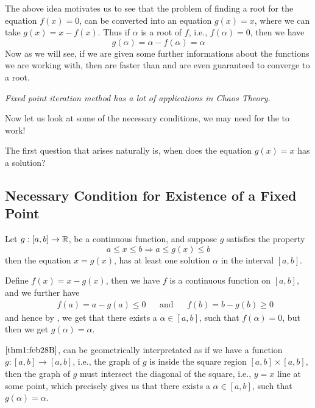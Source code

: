 The above idea motivates us to see that the problem of finding a root for the equation $f(x) = 0$, can be converted into an equation $g(x) = x$, where we can take $g(x) = x - f(x)$. Thus if $\alpha$ is a root of $f$, i.e., $f(\alpha) = 0$, then we have 
\[g(\alpha) = \alpha - f(\alpha) = \alpha\]
Now as we will see, if we are given some further informations about the functions we are working with, then  are faster than  and are even guaranteed to converge to a root.

\begin{tcolorbox}[
    colback = cyan!5,
    colframe = cyan!75
]
     \textit{Fixed point iteration method has a lot of applications in Chaos Theory.} 
\end{tcolorbox}

Now let us look at some of the necessary conditions, we may need for the  to work! 

The first question that arises naturally is, when does the equation $g(x) = x$ has a solution?

\subsection{Necessary Condition for Existence of a Fixed Point}

\begin{thm}\label{thm1:feb28B}
    Let $g :[a,b] \to \mathbb{R}$, be a continuous function, and suppose $g$ satisfies the property 
    \[
        a \leq x \leq b \Rightarrow a \leq g(x) \leq b
    \]
    then the equation $x = g(x)$, has at least one solution $ \alpha $ in the interval $[a,b]$.
\end{thm}

\begin{prf}
    Define $f(x) = x - g(x)$, then we have $f$ is a continuous function on $[a,b]$, and we further have 
    \begin{align*}
        &&f(a) = a-g(a) \leq 0 &&\mbox{and} &&f(b) = b - g(b) \geq 0
    \end{align*}
    and hence by , we get that there exists a $\alpha \in [a,b]$, such that $f(\alpha) = 0$, but then we get $g(\alpha) = \alpha$.
\end{prf}

 $\ref{thm1:feb28B}$, can be geometrically interpretated as if we have a function $g :[a,b] \to [a,b]$, i.e., the graph of $g$ is inside the square region $[a,b] \times [a,b]$, then the graph of $g$ must intersect the diagonal of the square, i.e., $y = x$ line at some point, which precisely gives us that there exists a $\alpha \in [a,b]$, such that $g(\alpha) = \alpha$.

